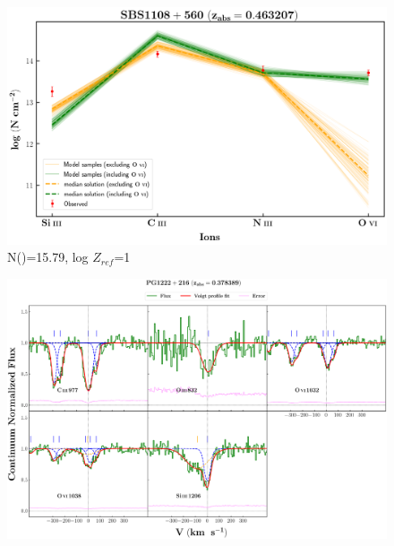 \documentclass[12pt]{report}
\newcommand\ion[2]{\text{#1\,\textsc{\lowercase{#2}}}}
\begin{document}
\begin{figure}[!b]
    \centering
    \includegraphics[width=0.85\linewidth]{Ionisation-Modelling-Plots/sbs1108-z=0.463207-compII_logZ=1.png}
    \caption{N(\ion{H}{i})=15.79, log $Z_{ref}$=1}
\end{figure}



\newpage

\begin{landscape}

\begin{figure}
    \centering
    \vspace{-20mm}
    \hspace*{-35mm}
    \includegraphics[width=1.25\linewidth]{System-Plots/PG1222+216_z=0.378389_sys_plot.png}
\end{figure}

\end{landscape}
\end{document}
